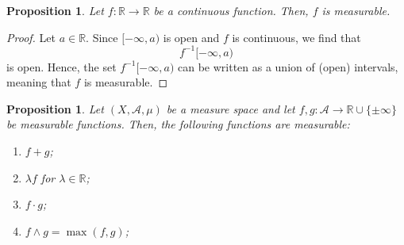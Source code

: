 \documentclass[a4paper, openany]{memoir}
\theoremstyle{definition}
\theoremstyle{plain}
\newtheorem{proposition}[definition]{Proposition}
\begin{document}
    \begin{proposition}
        Let $f \colon \mathbb{R} \to \mathbb{R}$ be a continuous function. Then, $f$ is measurable.
    \end{proposition}
    \begin{proof}
        Let $a \in \mathbb{R}$. Since $[-\infty, a)$ is open and $f$ is continuous, we find that
        \[f^{-1}[-\infty, a)\]
        is open. Hence, the set $f^{-1}[-\infty, a)$ can be written as a union of (open) intervals, meaning that $f$ is measurable.
    \end{proof}

    \begin{proposition}
        Let $(X, \mathcal{A}, \mu)$ be a measure space and let $f, g \colon \mathcal{A} \to \mathbb{R} \cup \{\pm \infty\}$ be measurable functions. Then, the following functions are measurable:
        \begin{enumerate}
            \item $f + g$;
            \item $\lambda f$ for $\lambda \in \mathbb{R}$;
            \item $f \cdot g$;
            \item $f \land g = \max(f, g)$;
        \end{enumerate}
    \end{proposition}
\end{document}
